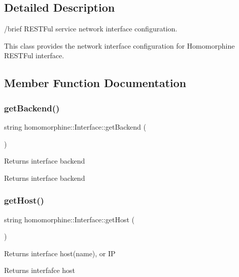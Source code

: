\subsection{Detailed Description}
/brief R\+E\+S\+T\+Ful service network interface configuration.

This class provides the network interface configuration for Homomorphine R\+E\+S\+T\+Ful interface. 

\subsection{Member Function Documentation}
\mbox{\label{classhomomorphine_1_1_interface_aa52801359888c6758cd4a75d6804eb1e}} 
\subsubsection{\texorpdfstring{getBackend()}{getBackend()}}
{\footnotesize\ttfamily string homomorphine\+::\+Interface\+::get\+Backend (\begin{DoxyParamCaption}{ }\end{DoxyParamCaption})}

Returns interface backend

\begin{DoxyReturn}{Returns}
interface backend 
\end{DoxyReturn}
\mbox{\label{classhomomorphine_1_1_interface_a2cd00479c3d14493d31362234f774db9}} 
\subsubsection{\texorpdfstring{getHost()}{getHost()}}
{\footnotesize\ttfamily string homomorphine\+::\+Interface\+::get\+Host (\begin{DoxyParamCaption}{ }\end{DoxyParamCaption})}

Returns interface host(name), or IP

\begin{DoxyReturn}{Returns}
interfafce host 
\end{DoxyReturn}
\mbox{\label{classhomomorphine_1_1_interface_a4433e13909f0e96ab45eeeb9ced8ac56}} 
